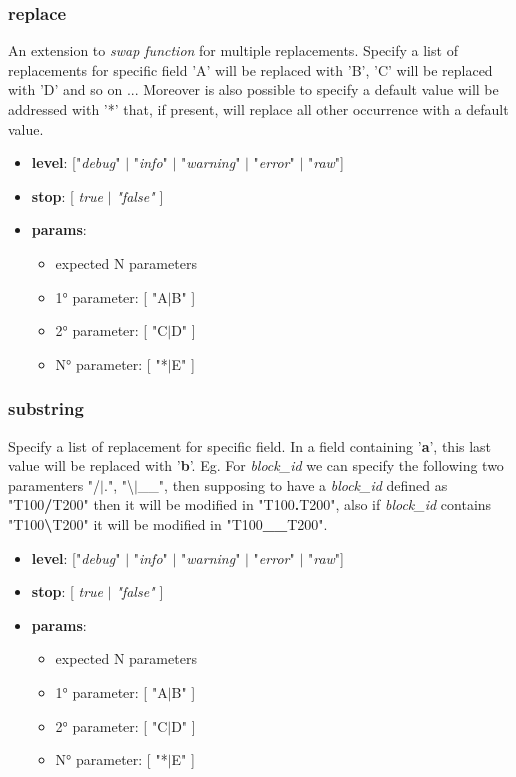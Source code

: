 \documentclass[12pt, a4paper]{book}
\begin{document}
\subsubsection{replace}
\begin{justify}
An extension to \textit{swap function} for multiple replacements.
Specify a list of replacements for specific field 'A' will be replaced with 'B', 'C' will be replaced with 'D' and so on ...
Moreover is also possible to specify a default value will be addressed with '*' that, if present, will replace all other occurrence with a default value.
\end{justify}

\begin{itemize}
\item \textbf{level}: ["\textit{debug}" $|$ "\textit{info}" $|$ "\textit{warning}" $|$ "\textit{error}" $|$ "\textit{raw}"]
\item \textbf{stop}: [ \textit{true} $|$ \textit{"false"} ]
\item \textbf{params}: 
  \begin{itemize}
  \item expected N parameters
  \item 1° parameter: [ "A$|$B" ]
  \item 2° parameter: [ "C$|$D" ]
  \item N° parameter: [ "*$|$E" ]
  \end{itemize}
\end{itemize}


\newpage
\subsubsection{substring}
\begin{justify}
Specify a list of replacement for specific field. In a field containing '\textbf{a}', this last value will be replaced with '\textbf{b}'.\newline
Eg. For \textit{block\_id} we can specify the following two paramenters "/$|$.", "\textbackslash$|$\_\_", then supposing to have a \textit{block\_id} defined as "T100\textbf{/}T200" then it will be modified in "T100\textbf{.}T200", also if \textit{block\_id} contains "T100\textbf{\textbackslash}T200" it will be modified in "T100\textbf{\_\_}T200".
\end{justify}

\begin{itemize}
\item \textbf{level}: ["\textit{debug}" $|$ "\textit{info}" $|$ "\textit{warning}" $|$ "\textit{error}" $|$ "\textit{raw}"]
\item \textbf{stop}: [ \textit{true} $|$ \textit{"false"} ]
\item \textbf{params}: 
  \begin{itemize}
  \item expected N parameters
  \item 1° parameter: [ "A$|$B" ]
  \item 2° parameter: [ "C$|$D" ]
  \item N° parameter: [ "*$|$E" ]
  \end{itemize}
\end{itemize}
\end{document}
